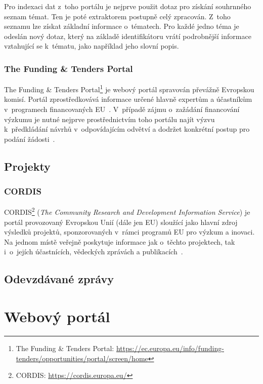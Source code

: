 Pro indexaci dat z~toho portálu je nejprve použit dotaz pro získání souhrnného seznam témat. Ten je poté extraktorem postupně celý zpracován. Z~toho seznamu lze získat základní informace o~tématech. Pro každé jedno téma je odeslán nový dotaz, který na základě identifikátoru vrátí podrobnější informace vztahující se k~tématu, jako například jeho slovní popis.

\subsubsection*{The Funding \& Tenders Portal}\label{section:funding}

The Funding \& Tenders Portal\footnote{The Funding \& Tenders Portal: \url{https://ec.europa.eu/info/funding-tenders/opportunities/portal/screen/home}} je webový portál spravován převážně Evropskou komisí. Portál zprostředkovává informace určené hlavně expertům a účastníkům v~programech financovaných EU~\cite{bib:funding-about}.
V~případě zájmu o~zažádání financování výzkumu je nutné nejprve prostřednictvím toho portálu najít výzvu k~předkládání návrhů v~odpovídajícím odvětví a dodržet konkrétní postup pro podání žádosti~\cite{bib:funding-find}.

\subsection{Projekty}
\blindtext

\subsubsection*{CORDIS}
CORDIS\footnote{CORDIS: \url{https://cordis.europa.eu/}} (\emph{The Community Research and Development Information Service}) je portál provozovaný Evropskou Unií (dále jen EU) sloužící jako hlavní zdroj výsledků projektů, sponzorovaných v~rámci programů EU pro výzkum a inovaci. Na jednom místě veřejně poskytuje informace jak o~těchto projektech, tak i~o~jejích účastnících, vědeckých zprávách a publikacích~\cite{bib:cordis}.

\subsection{Odevzdávané zprávy}
\blindtext



\section{Webový portál}
\blindtext

